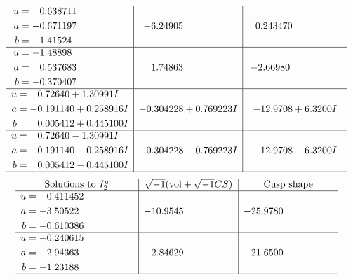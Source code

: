 \documentclass[1p]{elsarticle_modified}
\theoremstyle{definition}
\newcommand{\I}{\sqrt{-1}}
\begin{document}
$$\begin{array}{c|c|c}
\begin{aligned}
u &= \phantom{-}0.638711\phantom{ +0.000000I} \\
a &= -0.671197\phantom{ +0.000000I} \\
b &= -1.41524\phantom{ +0.000000I}\end{aligned}
 & -6.24905\phantom{ +0.000000I} & \phantom{-}0.243470\phantom{ +0.000000I} \\ \hline\begin{aligned}
u &= -1.48898\phantom{ +0.000000I} \\
a &= \phantom{-}0.537683\phantom{ +0.000000I} \\
b &= -0.370407\phantom{ +0.000000I}\end{aligned}
 & \phantom{-}1.74863\phantom{ +0.000000I} & -2.66980\phantom{ +0.000000I} \\ \hline\begin{aligned}
u &= \phantom{-}0.72640 + 1.30991 I \\
a &= -0.191140 + 0.258916 I \\
b &= \phantom{-}0.005412 + 0.445100 I\end{aligned}
 & -0.304228 + 0.769223 I & -12.9708 + 6.3200 I \\ \hline\begin{aligned}
u &= \phantom{-}0.72640 - 1.30991 I \\
a &= -0.191140 - 0.258916 I \\
b &= \phantom{-}0.005412 - 0.445100 I\end{aligned}
 & -0.304228 - 0.769223 I & -12.9708 - 6.3200 I\\
 \hline 
 \end{array}$$\newpage$$\begin{array}{c|c|c}  
\text{Solutions to }I^u_{2}& \I (\text{vol} + \sqrt{-1}CS) & \text{Cusp shape}\\
 \hline 
\begin{aligned}
u &= -0.411452\phantom{ +0.000000I} \\
a &= -3.50522\phantom{ +0.000000I} \\
b &= -0.610386\phantom{ +0.000000I}\end{aligned}
 & -10.9545\phantom{ +0.000000I} & -25.9780\phantom{ +0.000000I} \\ \hline\begin{aligned}
u &= -0.240615\phantom{ +0.000000I} \\
a &= \phantom{-}2.94363\phantom{ +0.000000I} \\
b &= -1.23188\phantom{ +0.000000I}\end{aligned}
 & -2.84629\phantom{ +0.000000I} & -21.6500\phantom{ +0.000000I}\\
 \hline 
 \end{array}$$\newpage
\end{document}
